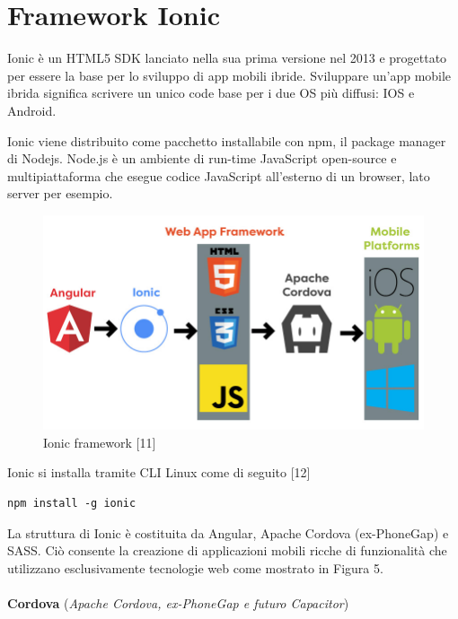 \paragraph{}
\paragraph{}
\paragraph{}
\section{Framework Ionic}

Ionic è un HTML5 SDK lanciato nella sua prima versione nel 2013 e progettato per essere la base per lo sviluppo di app mobili ibride. 
Sviluppare un'app mobile ibrida significa scrivere un unico code base per i due OS più diffusi: IOS e Android.

Ionic viene distribuito come pacchetto installabile con npm, il package manager di Nodejs.
Node.js è un ambiente di run-time JavaScript open-source e multipiattaforma che esegue codice JavaScript all'esterno di un browser, lato server per esempio.

\begin{figure}[h!]
    \centering  
    \caption{Ionic framework [11]}
    \includegraphics[scale=0.4]{img/cap2/angular-ionic}
\end{figure}

Ionic si installa tramite CLI Linux come di seguito [12]
\begin{lstlisting}
npm install -g ionic
\end{lstlisting}

La struttura di Ionic è costituita da Angular, Apache Cordova (ex-PhoneGap) e SASS. Ciò consente la creazione di applicazioni mobili ricche di funzionalità che utilizzano esclusivamente tecnologie web come mostrato in Figura 5.
\\\\
\textbf{Cordova}
(\textit{Apache Cordova, ex-PhoneGap e futuro Capacitor})

